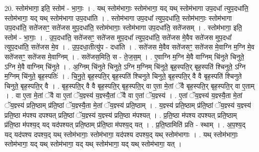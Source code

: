 \documentclass[17pt]{extarticle}
\begin{document}
20. स्तोम॑भागा॒ इति॒ स्तोम॑ - भा॒गाः॒ । . यथ् स्तोम॑भागाः॒ स्तोम॑भागा॒ यद् यथ् स्तोम॑भागा उप॒दधा᳚ त्युप॒दधा॑ति॒ स्तोम॑भागा॒ यद् यथ् स्तोम॑भागा उप॒दधा॑ति । . स्तोम॑भागा उप॒दधा᳚ त्युप॒दधा॑ति॒ स्तोम॑भागाः॒ स्तोम॑भागा उप॒दधा॑ति॒ सते॑जसꣳ॒॒ सते॑जस मुप॒दधा॑ति॒ स्तोम॑भागाः॒ स्तोम॑भागा उप॒दधा॑ति॒ सते॑जसम् । . स्तोम॑भागा॒ इति॒ स्तोम॑ - भा॒गाः॒ । . उ॒प॒दधा॑ति॒ सते॑जसꣳ॒॒ सते॑जस मुप॒दधा᳚ त्युप॒दधा॑ति॒ सते॑जस मे॒वैव सते॑जस मुप॒दधा᳚ त्युप॒दधा॑ति॒ सते॑जस मे॒व । . उ॒प॒दधा॒तीत्यु॑प - दधा॑ति । . सते॑जस मे॒वैव सते॑जसꣳ॒॒ सते॑जस मे॒वाग्नि म॒ग्नि मे॒व सते॑जसꣳ॒॒ सते॑जस मे॒वाग्निम् । . सते॑जस॒मिति॒ स - ते॒ज॒स॒म् । . ए॒वाग्नि म॒ग्नि मे॒वै वाग्निम् चि॑नुते चिनुते॒ ऽग्नि मे॒वै वाग्निम् चि॑नुते । . अ॒ग्निम् चि॑नुते चिनुते॒ ऽग्नि म॒ग्निम् चि॑नुते॒ बृह॒स्पति॒र् बृह॒स्पति॑ श्चिनुते॒ ऽग्नि म॒ग्निम् चि॑नुते॒ बृह॒स्पतिः॑ । . चि॒नु॒ते॒ बृह॒स्पति॒र् बृह॒स्पति॑ श्चिनुते चिनुते॒ बृह॒स्पति॒र् वै वै बृह॒स्पति॑ श्चिनुते चिनुते॒ बृह॒स्पति॒र् वै । . बृह॒स्पति॒र् वै वै बृह॒स्पति॒र् बृह॒स्पति॒र् वा ए॒ता मे॒तां ॅवै बृह॒स्पति॒र् बृह॒स्पति॒र् वा ए॒ताम् । . वा ए॒ता मे॒तां ॅवै वा ए॒तां ॅय॒ज्ञ्स्य॑ य॒ज्ञ्स्यै॒तां ॅवै वा ए॒तां ॅय॒ज्ञ्स्य॑ । . ए॒तां ॅय॒ज्ञ्स्य॑ य॒ज्ञ्स्यै॒ता मे॒तां ॅय॒ज्ञ्स्य॑ प्रति॒ष्ठाम् प्र॑ति॒ष्ठां ॅय॒ज्ञ्स्यै॒ता मे॒तां ॅय॒ज्ञ्स्य॑ प्रति॒ष्ठाम् । . य॒ज्ञ्स्य॑ प्रति॒ष्ठाम् प्र॑ति॒ष्ठां ॅय॒ज्ञ्स्य॑ य॒ज्ञ्स्य॑ प्रति॒ष्ठा म॑पश्य दपश्यत् प्रति॒ष्ठां ॅय॒ज्ञ्स्य॑ य॒ज्ञ्स्य॑ प्रति॒ष्ठा म॑पश्यत् । . प्र॒ति॒ष्ठा म॑पश्य दपश्यत् प्रति॒ष्ठाम् प्र॑ति॒ष्ठा म॑पश्य॒द् यद् यद॑पश्यत् प्रति॒ष्ठाम् प्र॑ति॒ष्ठा म॑पश्य॒द् यत् । . प्र॒ति॒ष्ठामिति॑ प्रति - स्थाम् । . अ॒प॒श्य॒द् यद् यद॑पश्य दपश्य॒द् यथ् स्तोम॑भागाः॒ स्तोम॑भागा॒ यद॑पश्य दपश्य॒द् यथ् स्तोम॑भागाः । . यथ् स्तोम॑भागाः॒ स्तोम॑भागा॒ यद् यथ् स्तोम॑भागा॒ यद् यथ् स्तोम॑भागा॒ यद् यथ् स्तोम॑भागा॒ यत् । \newline
\end{document}

